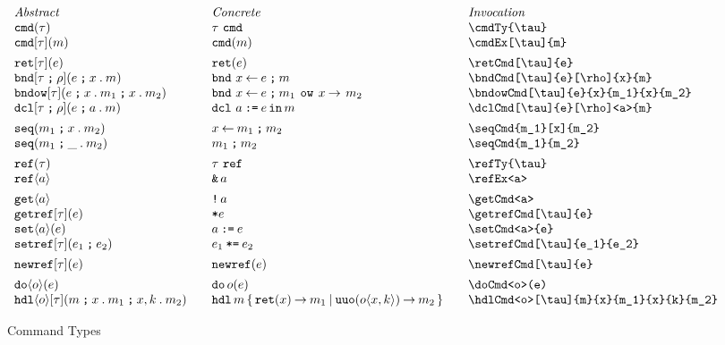 \documentclass[11pt]{article}
\begin{document}
\begin{figure}

  \begin{small}
    \begin{displaymath}
      \begin{array}{l@{\qquad}l@{\qquad}l@{\qquad}l}
        \textit{Abstract} & \textit{Concrete} & \textit{Invocation} \\
        \cmdTy{\tau}               & \cmdTy*{\tau}               & \verb|\cmdTy{\tau}|               \\
        \cmdEx[\tau]{m}            & \cmdEx*{m}                  & \verb|\cmdEx[\tau]{m}|            \\[1ex]
        \retCmd[\tau]{e}           & \retCmd*{e}                 & \verb|\retCmd[\tau]{e}|           \\
        \bndCmd[\tau]{e}[\rho]{x}{m}           & \bndCmd*{e}{x}{m}           & \verb|\bndCmd[\tau]{e}[\rho]{x}{m}|           \\
        \bndowCmd[\tau]{e}{x}{m_1}{x}{m_2}     & \bndowCmd*{e}{x}{m_1}{x}{m_2}  & \verb|\bndowCmd[\tau]{e}{x}{m_1}{x}{m_2}| \\
        \dclCmd[\tau]{e}[\rho]<a>{m}           & \dclCmd*{e}<a>{m}           & \verb|\dclCmd[\tau]{e}[\rho]<a>{m}|           \\[1ex]
        \seqCmd{m_1}[x]{m_2}       & \seqCmd*{m_1}[x]{m_2}          & \verb|\seqCmd{m_1}[x]{m_2}| \\
        \seqCmd{m_1}{m_2}          & \seqCmd*{m_1}{m_2}          & \verb|\seqCmd{m_1}{m_2}| \\[1ex]
        \refTy{\tau}               & \refTy*{\tau}               & \verb|\refTy{\tau}| \\
        \refEx<a>                  & \refEx*<a>                 & \verb|\refEx<a>|                  \\[1ex]
        \getCmd<a>                 & \getCmd*<a>                 & \verb|\getCmd<a>|                 \\
        \getrefCmd[\tau]{e}        & \getrefCmd*{e}              & \verb|\getrefCmd[\tau]{e}|        \\
        \setCmd<a>{e}              & \setCmd*<a>{e}              & \verb|\setCmd<a>{e}|              \\
        \setrefCmd[\tau]{e_1}{e_2} & \setrefCmd*[\tau]{e_1}{e_2} & \verb|\setrefCmd[\tau]{e_1}{e_2}|  \\[1ex]
        \newrefCmd[\tau]{e}        & \newrefCmd*{e}              & \verb|\newrefCmd[\tau]{e}| \\[1ex]
        \doCmd<o>(e)               & \doCmd*<o>(e)               & \verb|\doCmd<o>(e)| \\
        \hdlCmd<o>[\tau]{m}{x}{m_1}{x}{k}{m_2} & \hdlCmd*<o>{m}{x}{m_1}{x}{k}{m_2}  & \verb|\hdlCmd<o>[\tau]{m}{x}{m_1}{x}{k}{m_2}| 
      \end{array}
    \end{displaymath}
  \end{small}

  \caption{Command Types}
  \label{fig:cmd}
\end{figure}
\end{document}
